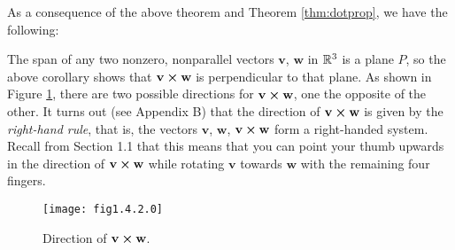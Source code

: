 As a consequence of the above theorem and Theorem \ref{thm:dotprop}, we have the following:


The span of any two nonzero, nonparallel vectors $\mathbf{v}$, $\mathbf{w}$ in $\mathbb{R}^{3}$ is a plane $P$, so the above
corollary shows that $\mathbf{v} \bm{\times} \mathbf{w}$ is perpendicular to that plane. As shown in
Figure \ref{fig:crossnormal}, there are two possible directions for $\mathbf{v} \bm{\times} \mathbf{w}$, one the
opposite of the other.
It turns out (see Appendix B) that the direction of $\mathbf{v} \bm{\times} \mathbf{w}$
is given by the \emph{right-hand rule}, that is, the vectors $\mathbf{v}$, $\mathbf{w}$,
$\mathbf{v} \bm{\times} \mathbf{w}$ form a right-handed system. Recall from Section 1.1 that this means that
you can point your thumb upwards in the direction of $\mathbf{v} \bm{\times} \mathbf{w}$
while rotating $\mathbf{v}$ towards $\mathbf{w}$ with the remaining four fingers.

\begin{figure}[h]
 \begin{center}
  \texttt{[image: fig1.4.2.0]}
 \end{center}
 \caption[]{\quad Direction of $\mathbf{v} \bm{\times} \mathbf{w}$.}
 \label{fig:crossnormal}
\end{figure}

